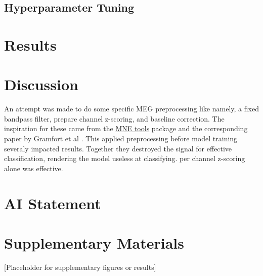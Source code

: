 \documentclass[conference]{IEEEtran}
\begin{document}
\subsection{Hyperparameter Tuning}

\section{Results}

\section{Discussion}
An attempt was made to do some specific MEG preprocessing like namely, a fixed bandpass filter, prepare
channel z-scoring, and baseline correction. The inspiration for these came from the 
\href{https://mne.tools/stable/index.html}{MNE tools} package and the corresponding paper by Gramfort et al 
\cite{gramfort2013meg}. This applied preprocessing before model training severaly impacted results.
Together they destroyed the signal for effective classification, rendering the model useless at 
classifying. per channel z-scoring alone was effective.

\section*{AI Statement}




\section*{Supplementary Materials}
[Placeholder for supplementary figures or results]

\clearpage
\onecolumn
\end{document}
